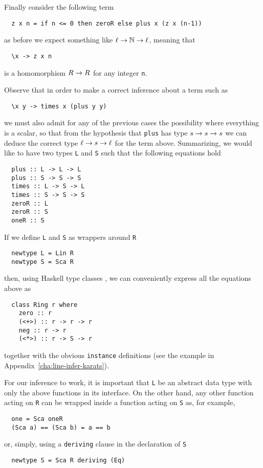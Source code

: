 Finally consider the following term
\begin{lstlisting}
  z x n = if n <= 0 then zeroR else plus x (z x (n-1))
\end{lstlisting}
as before we expect something like $\ell\rightarrow\mathbb{N}\rightarrow\ell$, meaning that
\begin{lstlisting}
  \x -> z x n
\end{lstlisting}
is a homomorphism $R\rightarrow R$ for any integer \lstinline{n}.

Observe that in order to make a correct inference about a term such as
\begin{lstlisting}
  \x y -> times x (plus y y)
\end{lstlisting}
we must also admit for any of the previous cases the possibility where
everything is a scalar, so that from the hypothesis that
\lstinline{plus} has type $s\rightarrow s\rightarrow s$ we can deduce the correct type
$\ell\rightarrow s\rightarrow\ell$ for the term above. Summarizing, we would like to
have two types \lstinline{L} and \lstinline{S} such that the following
equations hold
\begin{lstlisting}
  plus :: L -> L -> L
  plus :: S -> S -> S
  times :: L -> S -> L
  times :: S -> S -> S
  zeroR :: L
  zeroR :: S
  oneR :: S
\end{lstlisting}

If we define \lstinline{L} and \lstinline{S} as wrappers around
\lstinline{R}
\begin{lstlisting}
  newtype L = Lin R
  newtype S = Sca R
\end{lstlisting}
then, using Haskell type classes
\cite{Walder+Blott-ad-hoc-polymorphism}, we can conveniently express
all the equations above as
\begin{lstlisting}
  class Ring r where
    zero :: r
    (<+>) :: r -> r -> r
    neg :: r -> r
    (<*>) :: r -> S -> r
\end{lstlisting}
together with the obvious \lstinline{instance} definitions (see the
example in Appendix~\ref{cha:line-infer-karats}). 

  For our
inference to work, it is important that \lstinline{L} be an abstract
data type with only the above functions in its interface. On the other
hand, any other function acting on \lstinline{R} can be wrapped inside
a function acting on \lstinline{S} as, for example,
\begin{lstlisting}
  one = Sca oneR
  (Sca a) == (Sca b) = a == b
\end{lstlisting}
or, simply, using a \lstinline{deriving} clause in the declaration of
\lstinline{S}
\begin{lstlisting}
  newtype S = Sca R deriving (Eq)
\end{lstlisting}

